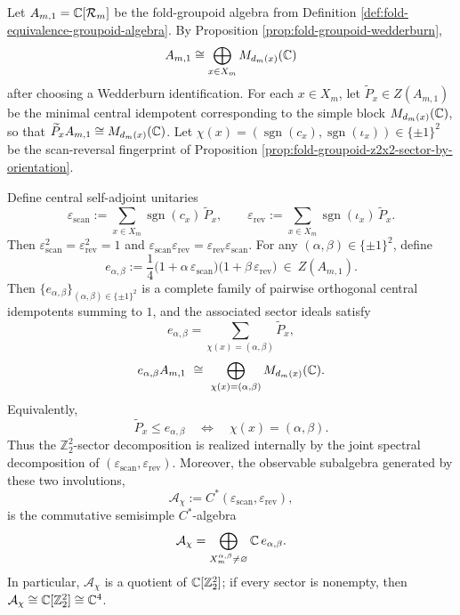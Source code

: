 \begin{theorem}\label{thm:fold-groupoid-z2x2-central-idempotents}
Let \(A_{m,1}=\mathbb{C}[\mathcal{R}_m]\) be the fold-groupoid algebra from Definition \ref{def:fold-equivalence-groupoid-algebra}. By Proposition \ref{prop:fold-groupoid-wedderburn},
\[
A_{m,1}\cong \bigoplus_{x\in X_m}M_{d_m(x)}(\mathbb{C})
\]
after choosing a Wedderburn identification.
For each \(x\in X_m\), let \(\widetilde P_x\in Z(A_{m,1})\) be the minimal central idempotent corresponding to the simple block \(M_{d_m(x)}(\mathbb{C})\), so that
\(
\widetilde P_x A_{m,1}\cong M_{d_m(x)}(\mathbb{C})
\).
Let
\(
\chi(x)=(\operatorname{sgn}(c_x),\operatorname{sgn}(\iota_x))\in\{\pm1\}^2
\)
be the scan-reversal fingerprint of Proposition \ref{prop:fold-groupoid-z2x2-sector-by-orientation}.

Define central self-adjoint unitaries
\[
\varepsilon_{\mathrm{scan}}:=\sum_{x\in X_m}\operatorname{sgn}(c_x)\,\widetilde P_x,
\qquad
\varepsilon_{\mathrm{rev}}:=\sum_{x\in X_m}\operatorname{sgn}(\iota_x)\,\widetilde P_x.
\]
Then \(\varepsilon_{\mathrm{scan}}^2=\varepsilon_{\mathrm{rev}}^2=1\) and \(\varepsilon_{\mathrm{scan}}\varepsilon_{\mathrm{rev}}=\varepsilon_{\mathrm{rev}}\varepsilon_{\mathrm{scan}}\).
For any \((\alpha,\beta)\in\{\pm1\}^2\), define
\[
e_{\alpha,\beta}
:=
\frac14\bigl(1+\alpha\,\varepsilon_{\mathrm{scan}}\bigr)\bigl(1+\beta\,\varepsilon_{\mathrm{rev}}\bigr)
\ \in\ Z(A_{m,1}).
\]
Then \(\{e_{\alpha,\beta}\}_{(\alpha,\beta)\in\{\pm1\}^2}\) is a complete family of pairwise orthogonal central idempotents summing to \(1\), and the associated sector ideals satisfy
\[
e_{\alpha,\beta}
=
\sum_{\chi(x)=(\alpha,\beta)}\widetilde P_x,
\]
\[
e_{\alpha,\beta}A_{m,1}
\ \cong\
\bigoplus_{\chi(x)=(\alpha,\beta)}M_{d_m(x)}(\mathbb{C}).
\]
Equivalently,
\[
\widetilde P_x\le e_{\alpha,\beta}
\quad\Longleftrightarrow\quad
\chi(x)=(\alpha,\beta).
\]
Thus the \(\mathbb Z_2^2\)-sector decomposition is realized internally by the joint spectral decomposition of \((\varepsilon_{\mathrm{scan}},\varepsilon_{\mathrm{rev}})\).
Moreover, the observable subalgebra generated by these two involutions,
\[
\mathcal A_\chi:=C^\ast(\varepsilon_{\mathrm{scan}},\varepsilon_{\mathrm{rev}}),
\]
is the commutative semisimple \(C^\ast\)-algebra
\[
\mathcal A_\chi=\bigoplus_{X_m^{\alpha,\beta}\neq\varnothing}\mathbb{C}\,e_{\alpha,\beta}.
\]
In particular, \(\mathcal A_\chi\) is a quotient of \(\mathbb{C}[\mathbb Z_2^2]\); if every sector is nonempty, then \(\mathcal A_\chi\cong \mathbb{C}[\mathbb Z_2^2]\cong \mathbb{C}^4\).
\end{theorem}

